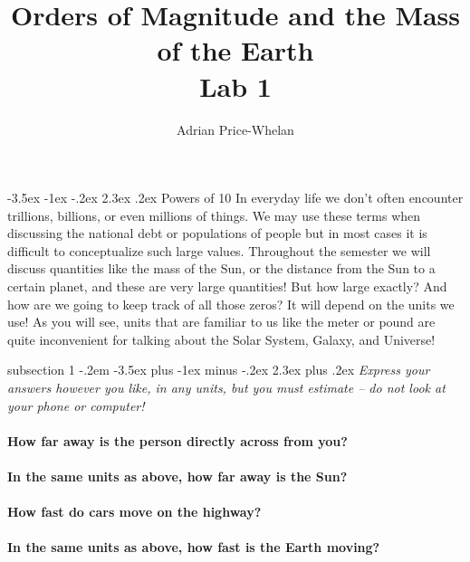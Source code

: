 \documentclass[12pt]{article}
\makeatletter
\newenvironment{problem}{\@startsection
       {subsection}
       {1}
       {-.2em}
       {-3.5ex plus -1ex minus -.2ex}
       {2.3ex plus .2ex}
       {\pagebreak[3]%
       \normalsize\bf\noindent{Problem }
       }
       }
       {%
       }
\renewcommand\section{\@startsection{section}{1}{\z@}%
                                  {-3.5ex \@plus -1ex \@minus -.2ex}%
                                  {2.3ex \@plus.2ex}%
                                  {\normalfont\large\bfseries}}
\makeatother
\begin{document}
\title{Orders of Magnitude and the Mass of the Earth \\ \large \textbf{Lab 1}}
\author{Adrian Price-Whelan}

\maketitle

\thispagestyle{empty}

\section{Powers of 10}
\indent\indent In everyday life we don't often encounter trillions, billions, or even millions of things. We may use these terms when discussing the national debt or populations of people but in most cases it is difficult to conceptualize such large values. Throughout the semester we will discuss quantities like the mass of the Sun, or the distance from the Sun to a certain planet, and these are very large quantities! But how large exactly? And how are we going to keep track of all those zeros? It will depend on the units we use! As you will see, units that are familiar to us like the meter or pound are quite inconvenient for talking about the Solar System, Galaxy, and Universe!


\begin{problem}{ }
	\textit{Express your answers however you like, in any units, but you must estimate -- do not look at your phone or computer!}  \\ \\
	\textbf{How far away is the person directly across from you?} \hrulefill \\ \\
	\textbf{In the same units as above, how far away is the Sun?} \hrulefill \\ \\
	\textbf{How fast do cars move on the highway?} \hrulefill \\ \\
	\textbf{In the same units as above, how fast is the Earth moving?} \hrulefill 
\end{problem}
\end{document}
